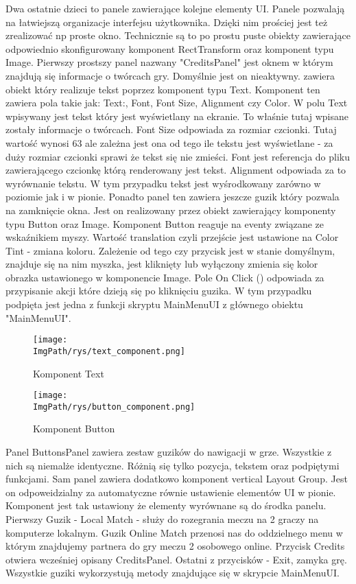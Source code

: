\documentclass[a4paper,12pt,twoside,openany]{report}
\newcommand{\ImgPath}{.}
\begin{document}
Dwa ostatnie dzieci to panele zawierające kolejne elementy UI. Panele pozwalają na łatwiejszą organizacje interfejsu użytkownika. Dzięki nim prościej jest też zrealizować np proste okno. Technicznie są to po prostu puste obiekty zawierające odpowiednio skonfigurowany komponent RectTransform oraz komponent typu Image. Pierwszy prostszy panel nazwany "CreditsPanel" jest oknem w którym znajdują się informacje o twórcach gry. Domyślnie jest on nieaktywny. zawiera obiekt który realizuje tekst poprzez komponent typu Text. Komponent ten zawiera pola takie jak: Text:, Font, Font Size, Alignment czy Color. W polu Text wpisywany jest tekst który jest wyświetlany na ekranie. To właśnie tutaj wpisane zostały informacje o twórcach. Font Size odpowiada za rozmiar czcionki. Tutaj wartość wynosi 63 ale zależna jest ona od tego ile tekstu jest wyświetlane - za duży rozmiar czcionki sprawi że tekst się nie zmieści. Font jest referencja do pliku zawierającego czcionkę którą renderowany jest tekst. Alignment odpowiada za to wyrównanie tekstu. W tym przypadku tekst jest wyśrodkowany zarówno w poziomie jak i w pionie. Ponadto panel ten zawiera jeszcze guzik który pozwala na zamknięcie okna. Jest on realizowany przez obiekt zawierający komponenty typu Button oraz Image. Komponent Button reaguje na eventy związane ze wskaźnikiem myszy. Wartość translation czyli przejście jest ustawione na Color Tint - zmiana koloru. Zależenie od tego czy przycisk jest w stanie domyślnym, znajduje się na nim myszka, jest kliknięty lub wyłączony zmienia się kolor obrazka ustawionego w komponencie Image. Pole On Click () odpowiada za przypisanie akcji które dzieją się po kliknięciu guzika. W tym przypadku podpięta jest jedna z funkcji skryptu MainMenuUI z głównego obiektu "MainMenuUI".

\begin{figure}[H]
	\begin{center}
\centering
\texttt{[image: \\ImgPath/rys/text\_component.png]}
\end{center}
	\caption{Komponent Text}
	\label{text_component}
\end{figure}


\begin{figure}[H]
	\begin{center}
\centering
\texttt{[image: \\ImgPath/rys/button\_component.png]}
\end{center}
	\caption{Komponent Button}
	\label{button_component}
\end{figure}

Panel ButtonsPanel zawiera zestaw guzików do nawigacji w grze. Wszystkie z nich są niemalże identyczne. Różnią się tylko pozycja, tekstem oraz podpiętymi funkcjami. Sam panel zawiera dodatkowo komponent vertical Layout Group. Jest on odpoweidzialny za automatyczne równie ustawienie elementów UI w pionie. Komponent jest tak ustawiony że elementy wyrównane są do środka panelu. Pierwszy Guzik - Local Match - służy do rozegrania meczu na 2 graczy na komputerze lokalnym. Guzik Online Match przenosi nas do oddzielnego menu w którym znajdujemy partnera do gry meczu 2 osobowego online. Przycisk Credits otwiera wcześniej opisany CreditsPanel. Ostatni z przycisków - Exit, zamyka grę. Wszystkie guziki wykorzystują metody znajdujące się w skrypcie MainMenuUI.
\end{document}
